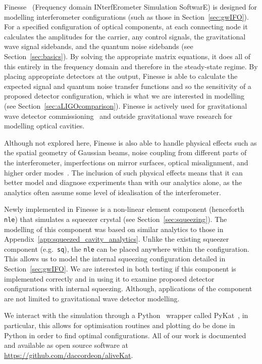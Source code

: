 \documentclass[aps,pra,superscriptaddress,reprint,nofootinbib]{revtex4-1}
\newcommand{\code}[1]{\texttt{#1}}
\begin{document}
Finesse~\cite{finesse} (Frequency domain INterfErometer Simulation SoftwarE) is designed for modelling interferometer configurations (such as those in Section~\ref{sec:gwIFO}). For a specified configuration of optical components, at each connecting node it calculates the amplitudes for the carrier, any control signals, the gravitational wave signal sidebands, and the quantum noise sidebands (see Section~\ref{sec:basics}). By solving the appropriate matrix equations, it does all of this entirely in the frequency domain and therefore in the steady-state regime.
By placing appropriate detectors at the output, Finesse is able to calculate the expected signal and quantum noise transfer functions and so the sensitivity of a proposed detector configuration, which is what we are interested in modelling (see Section~\ref{sec:aLIGOcomparison}). Finesse is actively used for gravitational wave detector commissioning~\cite{brown2020pykat} and outside gravitational wave research for modelling optical cavities.


Although not explored here, Finesse is also able to handle physical effects such as the spatial geometry of Gaussian beams, noise coupling from different parts of the interferometer, imperfections on mirror surfaces, optical misalignment, and higher order modes~\cite{Bond_et_al_2016}. The inclusion of such physical effects means that it can better model and diagnose experiments than with our analytics alone, as the analytics often assume some level of idealisation of the interferometer.


Newly implemented in Finesse is a non-linear element component (henceforth \code{nle}) that simulates a squeezer crystal (see Section~\ref{sec:squeezing}). The modelling of this component was based on similar analytics to those in Appendix~\ref{app:squeezed_cavity_analytics}. Unlike the existing squeezer component (e.g.\ \code{sq}), the \code{nle} can be placed anywhere within the configuration. This allows us to model the internal squeezing configuration detailed in Section~\ref{sec:gwIFO}. We are interested in both testing if this component is implemented correctly and in using it to examine proposed detector configurations with internal squeezing. Although, applications of the component are not limited to gravitational wave detector modelling.


We interact with the simulation through a Python~\cite{python} wrapper called PyKat~\cite{brown2020pykat}, in particular, this allows for optimisation routines and plotting do be done in Python in order to find optimal configurations. All of our work is documented and available as open source software at \url{https://github.com/daccordeon/aliveKat}.
\end{document}
